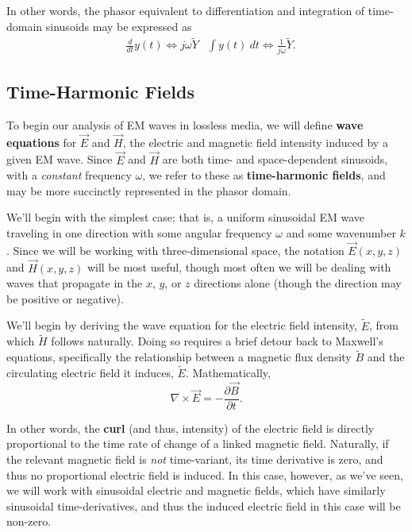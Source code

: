 \documentclass{article}
\begin{document}
In other words, the phasor equivalent to differentiation and integration of time-domain sinusoids may be expressed as
\begin{align*}
	&\frac{d}{dt}y(t) \Leftrightarrow j\omega\widetilde{Y} &\int y(t) \ dt \Leftrightarrow \frac{1}{j\omega}\widetilde{Y}.
\end{align*}

\setcounter{subsection}{0}
\subsection{Time-Harmonic Fields}
To begin our analysis of EM waves in lossless media, we will define \textbf{wave equations} for \(\vec{E}\) and \(\vec{H}\), the electric and magnetic field intensity induced by a given EM wave. Since \(\vec{E}\) and \(\vec{H}\) are both time- and space-dependent sinusoids, with a \textit{constant} frequency \(\omega\), we refer to these as \textbf{time-harmonic fields}, and may be more succinctly represented in the phasor domain. 

We'll begin with the simplest case; that is, a uniform sinusoidal EM wave traveling in one direction with some angular frequency \(\omega\) and some wavenumber \(k\). Since we will be working with three-dimensional space, the notation \(\vec{E}(x,y,z)\) and \(\vec{H}(x,y,z)\) will be most useful, though most often we will be dealing with waves that propagate in the \(x\), \(y\), or \(z\) directions alone (though the direction may be positive or negative). 

We'll begin by deriving the wave equation for the electric field intensity, \(\widetilde{E}\), from which \(\widetilde{H}\) follows naturally. Doing so requires a brief detour back to Maxwell's equations, specifically the relationship between a magnetic flux density \(\widetilde{B}\) and the circulating electric field it induces, \(\widetilde{E}\). Mathematically,
\[
  \nabla \times \vec{E} = -\frac{\partial \vec{B}}{\partial t}.
\]

In other words, the \textbf{curl} (and thus, intensity) of the electric field is directly proportional to the time rate of change of a linked magnetic field. Naturally, if the relevant magnetic field is \textit{not} time-variant, its time derivative is zero, and thus no proportional electric field is induced. In this case, however, as we've seen, we will work with sinusoidal electric and magnetic fields, which have similarly sinusoidal time-derivatives, and thus the induced electric field in this case will be non-zero.
\end{document}

